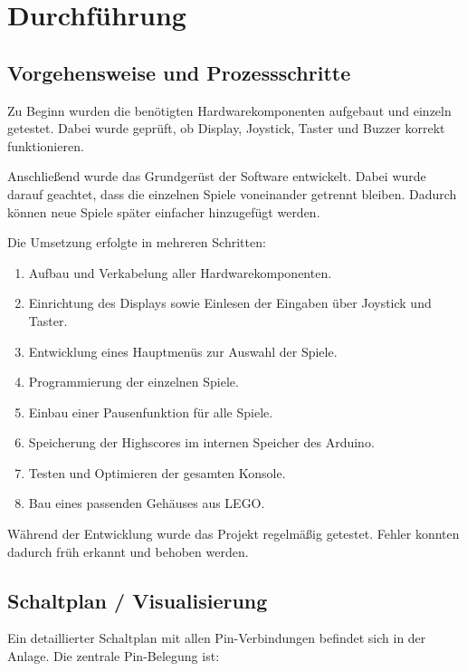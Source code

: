 \documentclass[12pt,a4paper]{article}
\begin{document}
\section{Durchführung}

\subsection{Vorgehensweise und Prozessschritte}

Zu Beginn wurden die benötigten Hardwarekomponenten aufgebaut und einzeln getestet. Dabei wurde geprüft, ob Display, Joystick, Taster und Buzzer korrekt funktionieren.

Anschließend wurde das Grundgerüst der Software entwickelt. Dabei wurde darauf geachtet, dass die einzelnen Spiele voneinander getrennt bleiben. Dadurch können neue Spiele später einfacher hinzugefügt werden.

Die Umsetzung erfolgte in mehreren Schritten:

\begin{enumerate}[noitemsep]
\item Aufbau und Verkabelung aller Hardwarekomponenten.
\item Einrichtung des Displays sowie Einlesen der Eingaben über Joystick und Taster.
\item Entwicklung eines Hauptmenüs zur Auswahl der Spiele.
\item Programmierung der einzelnen Spiele.
\item Einbau einer Pausenfunktion für alle Spiele.
\item Speicherung der Highscores im internen Speicher des Arduino.
\item Testen und Optimieren der gesamten Konsole.
\item Bau eines passenden Gehäuses aus LEGO.
\end{enumerate}

Während der Entwicklung wurde das Projekt regelmäßig getestet. Fehler konnten dadurch früh erkannt und behoben werden.


\subsection{Schaltplan / Visualisierung}

Ein detaillierter Schaltplan mit allen Pin-Verbindungen befindet sich in der Anlage.
Die zentrale Pin-Belegung ist:
\end{document}
